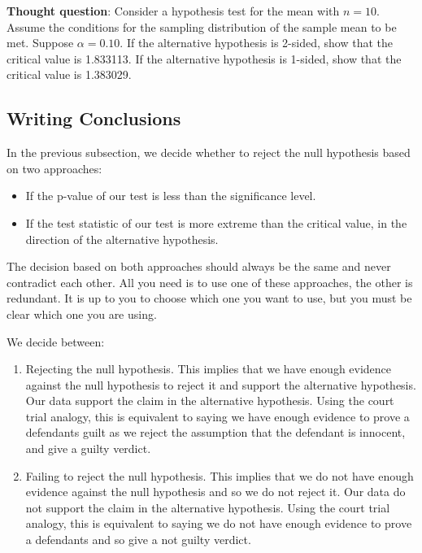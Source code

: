 \documentclass[
]{book}
\providecommand{\tightlist}{%
  \setlength{\itemsep}{0pt}\setlength{\parskip}{0pt}}
\theoremstyle{definition}
\theoremstyle{definition}
\theoremstyle{definition}
\theoremstyle{definition}
\theoremstyle{remark}
\begin{document}
\textbf{Thought question}: Consider a hypothesis test for the mean with \(n=10\). Assume the conditions for the sampling distribution of the sample mean to be met. Suppose \(\alpha=0.10\). If the alternative hypothesis is 2-sided, show that the critical value is 1.833113. If the alternative hypothesis is 1-sided, show that the critical value is 1.383029.

\hypertarget{writing-conclusions}{%
\subsection{Writing Conclusions}\label{writing-conclusions}}

In the previous subsection, we decide whether to reject the null hypothesis based on two approaches:

\begin{itemize}
\tightlist
\item
  If the p-value of our test is less than the significance level.
\item
  If the test statistic of our test is more extreme than the critical value, in the direction of the alternative hypothesis.
\end{itemize}

The decision based on both approaches should always be the same and never contradict each other. All you need is to use one of these approaches, the other is redundant. It is up to you to choose which one you want to use, but you must be clear which one you are using.

We decide between:

\begin{enumerate}
\def\labelenumi{\arabic{enumi}.}
\item
  Rejecting the null hypothesis. This implies that we have enough evidence against the null hypothesis to reject it and support the alternative hypothesis. Our data support the claim in the alternative hypothesis. Using the court trial analogy, this is equivalent to saying we have enough evidence to prove a defendants guilt as we reject the assumption that the defendant is innocent, and give a guilty verdict.
\item
  Failing to reject the null hypothesis. This implies that we do not have enough evidence against the null hypothesis and so we do not reject it. Our data do not support the claim in the alternative hypothesis. Using the court trial analogy, this is equivalent to saying we do not have enough evidence to prove a defendants and so give a not guilty verdict.
\end{enumerate}
\end{document}
